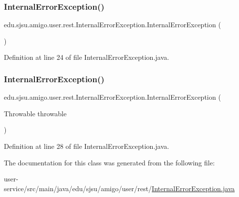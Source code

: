 \subsubsection{\texorpdfstring{Internal\+Error\+Exception()}{InternalErrorException()}\hspace{0.1cm}{\footnotesize\ttfamily [1/2]}}
{\footnotesize\ttfamily edu.\+sjsu.\+amigo.\+user.\+rest.\+Internal\+Error\+Exception.\+Internal\+Error\+Exception (\begin{DoxyParamCaption}{ }\end{DoxyParamCaption})}



Definition at line 24 of file Internal\+Error\+Exception.\+java.

\mbox{\label{classedu_1_1sjsu_1_1amigo_1_1user_1_1rest_1_1_internal_error_exception_a35c066e3f55d2d9a580e04169fdf116f}} 
\subsubsection{\texorpdfstring{Internal\+Error\+Exception()}{InternalErrorException()}\hspace{0.1cm}{\footnotesize\ttfamily [2/2]}}
{\footnotesize\ttfamily edu.\+sjsu.\+amigo.\+user.\+rest.\+Internal\+Error\+Exception.\+Internal\+Error\+Exception (\begin{DoxyParamCaption}\item[{Throwable}]{throwable }\end{DoxyParamCaption})}



Definition at line 28 of file Internal\+Error\+Exception.\+java.



The documentation for this class was generated from the following file\+:\begin{DoxyCompactItemize}
\item 
user-\/service/src/main/java/edu/sjsu/amigo/user/rest/\hyperlink{_internal_error_exception_8java}{Internal\+Error\+Exception.\+java}\end{DoxyCompactItemize}
